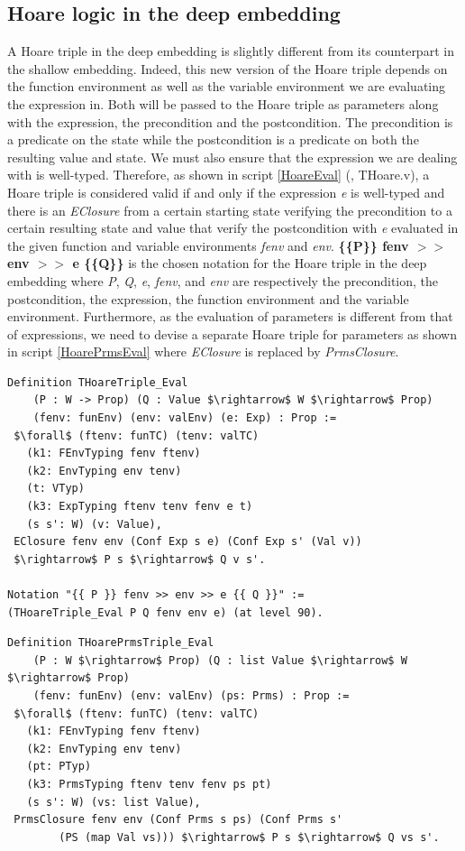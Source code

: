 \subsection{Hoare logic in the deep embedding} \label{HoareDeepSec}
A Hoare triple in the deep embedding is slightly different from its counterpart in the shallow embedding. Indeed, this new version of the Hoare triple depends on the function environment as well as the variable environment we are evaluating the expression in. Both will be passed to the Hoare triple as parameters along with the expression, the precondition and the postcondition. The precondition is a predicate on the state while the postcondition is a predicate on both the resulting value and state. We must also ensure that the expression we are dealing with is well-typed. Therefore, as shown in script \ref{HoareEval} (\cite{DEC}, THoare.v), a Hoare triple is considered valid if and only if the expression \emph{e} is well-typed and there is an \textit{EClosure} from a certain starting state verifying the precondition to a certain resulting state and value that verify the postcondition with \textit{e} evaluated in the given function and variable environments \textit{fenv} and \textit{env}. \textbf{\{\{P\}\} fenv $>>$ env $>>$ e \{\{Q\}\}} is the chosen notation for the Hoare triple in the deep embedding where \textit{P}, \textit{Q}, \textit{e}, \textit{fenv}, and \textit{env} are respectively the precondition, the postcondition, the expression, the function environment and the variable environment. Furthermore, as the evaluation of parameters is different from that of expressions, we need to devise a separate Hoare triple for parameters as shown in script \ref{HoarePrmsEval} where \textit{EClosure} is replaced by \textit{PrmsClosure}.
\pagebreak
\begin{lstlisting}[caption = {Hoare triple for expressions in the deep embedding}, label={HoareEval},mathescape=true]
Definition THoareTriple_Eval
    (P : W -> Prop) (Q : Value $\rightarrow$ W $\rightarrow$ Prop)
    (fenv: funEnv) (env: valEnv) (e: Exp) : Prop :=
 $\forall$ (ftenv: funTC) (tenv: valTC) 
   (k1: FEnvTyping fenv ftenv)
   (k2: EnvTyping env tenv)
   (t: VTyp)
   (k3: ExpTyping ftenv tenv fenv e t) 
   (s s': W) (v: Value),
 EClosure fenv env (Conf Exp s e) (Conf Exp s' (Val v)) 
 $\rightarrow$ P s $\rightarrow$ Q v s'.
 
Notation "{{ P }} fenv >> env >> e {{ Q }}" := 
(THoareTriple_Eval P Q fenv env e) (at level 90).
\end{lstlisting}
\begin{lstlisting}[caption = {Hoare triple for parameters in the deep embedding}, label={HoarePrmsEval},mathescape=true]
Definition THoarePrmsTriple_Eval
    (P : W $\rightarrow$ Prop) (Q : list Value $\rightarrow$ W $\rightarrow$ Prop)
    (fenv: funEnv) (env: valEnv) (ps: Prms) : Prop :=
 $\forall$ (ftenv: funTC) (tenv: valTC) 
   (k1: FEnvTyping fenv ftenv)
   (k2: EnvTyping env tenv)
   (pt: PTyp)
   (k3: PrmsTyping ftenv tenv fenv ps pt)
   (s s': W) (vs: list Value),
 PrmsClosure fenv env (Conf Prms s ps) (Conf Prms s' 
        (PS (map Val vs))) $\rightarrow$ P s $\rightarrow$ Q vs s'.
\end{lstlisting}


